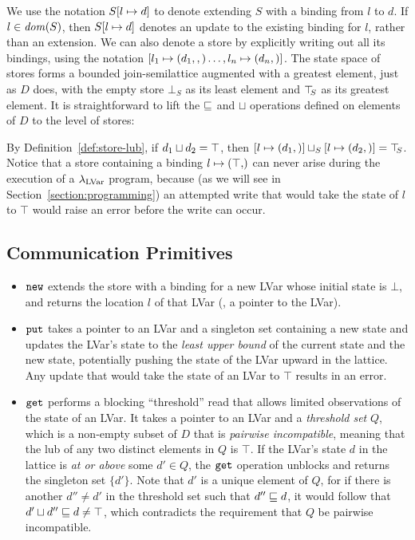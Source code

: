 \noindent We use the notation $S[l \mapsto d]$ to denote extending
$S$ with a binding from $l$ to $d$.  If $l \in \mathit{dom}(S)$, then
$S[l \mapsto d]$ denotes an update to the existing binding for $l$,
rather than an extension.  We can also denote a store by explicitly
writing out all its bindings, using the notation
$\left[ l_1 \mapsto (d_1, ,) \dots, l_n \mapsto (d_n, \right)]$.
The state space of stores forms a bounded join-semilattice augmented
with a greatest element, just as $D$ does, with the empty store
$\bot_S$ as its least element and $\top\hspace{-0.85mm}_{S}$ as its greatest element.  It
is straightforward to lift the $\sqsubseteq$ and $\sqcup$ operations
defined on elements of $D$ to the level of stores:

\DefLeqStore

\DefLubStore

\noindent By Definition~\ref{def:store-lub}, if $d_1 \sqcup d_2 =
\top$, then
$\left[ l \mapsto (d_1, \right)] \sqcup_{S} \left[ l \mapsto (d_2, \right)]
= \top\hspace{-0.85mm}_{S}$.  Notice that a store containing a binding
$\storebinding{l}{\top}$ can never arise during the execution of a
$\lambda_{\textrm{LVar}}$ program, because (as we will see in
Section~\ref{section:programming}) an attempted write that would take
the state of $l$ to $\top$ would raise an error before the write can
occur.

\subsection{Communication Primitives}\label{subsection:putget}

\begin{itemize}
\item $\mbox{\texttt{new}}$ extends the store with a binding for a new LVar whose
  initial state is $\bot$, and returns the location $l$ of that LVar
  (\ie, a pointer to the LVar).
\item $\mbox{\texttt{put}}$ takes a pointer to an LVar and a singleton set containing
  a new state and updates the LVar's state to the {\em least upper
  bound} of the current state and the new state, potentially pushing
  the state of the LVar upward in the lattice.  Any update that would
  take the state of an LVar to $\top$ results in an error.
\item $\mbox{\texttt{get}}$ performs a blocking ``threshold'' read that allows
  limited observations of the state of an LVar.  It takes a pointer to
  an LVar and a \emph{threshold set} $Q$, which is a non-empty subset
  of $D$ that is \emph{pairwise incompatible}, meaning that the lub of
  any two distinct elements in $Q$ is $\top$.  If the LVar's state $d$
  in the lattice is {\em at or above} some $d' \in Q$, the $\mbox{\texttt{get}}$
  operation unblocks and returns the singleton set $\lbrace
  d' \rbrace$.  Note that $d'$ is a unique element of $Q$, for if
  there is another $d'' \neq d'$ in the threshold set such that
  $d'' \sqsubseteq d$, it would follow that $d' \sqcup d'' \sqsubseteq
  d \neq \top$, which contradicts the requirement that $Q$ be pairwise
  incompatible.
\end{itemize}

